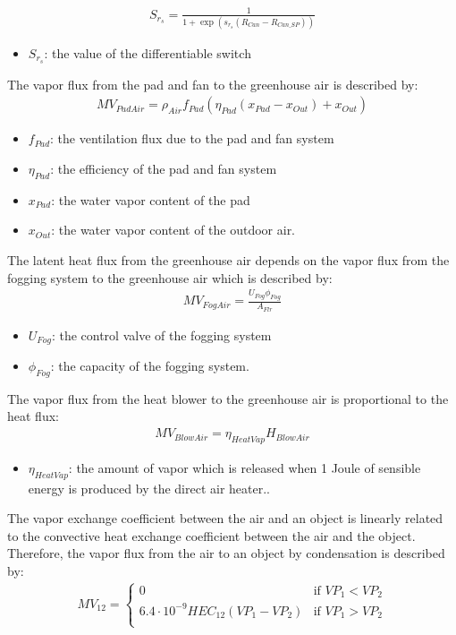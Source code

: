 \documentclass[a4paper]{article}
\numberwithin{equation}{section}
\begin{document}
\begin{align*}
  S_{r_s} = \frac{1}{1 + \exp \left(s_{r_s} (R_{Can} - R_{Can\_SP})\right)}
\end{align*}
\begin{itemize}
    \item \(S_{r_s}\): the value of the differentiable switch 
\end{itemize}
The vapor flux from the pad and fan to the greenhouse air is described by:
\begin{align*}
  MV_{PadAir} = \rho_{Air} f_{Pad} (\eta_{Pad} (x_{Pad} - x_{Out}) + x_{Out})
\end{align*}
\begin{itemize}
    \item \(f_{Pad}\): the ventilation flux due to the pad and fan system
    \item \(\eta_{Pad}\): the efficiency of the pad and fan system
    \item \(x_{Pad}\): the water vapor content of the pad
    \item \(x_{Out}\): the water vapor content of the outdoor air.
\end{itemize}
The latent heat flux from the greenhouse air depends on the vapor flux from the fogging system to the greenhouse air which is described by:
\begin{align*}
  MV_{FogAir} = \frac{U_{Fog} \phi_{Fog}}{A_{Flr}}
\end{align*}
\begin{itemize}
\item \(U_{Fog}\): the control valve of the fogging system
\item \(\phi_{Fog}\): the capacity of the fogging system.
\end{itemize}
The vapor flux from the heat blower to the greenhouse air is proportional to the heat flux:
\begin{align*}
  MV_{BlowAir} = \eta_{HeatVap} H_{BlowAir}
\end{align*}
\begin{itemize}
    \item \(\eta_{HeatVap}\): the amount of vapor which is released when 1 Joule of sensible energy is produced by the direct air heater..
\end{itemize}
The vapor exchange coefficient between the air and an object is linearly related to the convective heat exchange coefficient between the air and the object.
Therefore, the vapor flux from the air to an object by condensation is described by:
\begin{align*}
  \label{eq:vapor_conden}
  MV_{12} = \begin{cases}
    0                                       & \text{if~} VP_1 < VP_2 \\
    6.4 \cdot 10^{-9} HEC_{12}(VP_1 - VP_2) & \text{if~} VP_1 > VP_2 \\
  \end{cases}
\end{align*}
\end{document}
